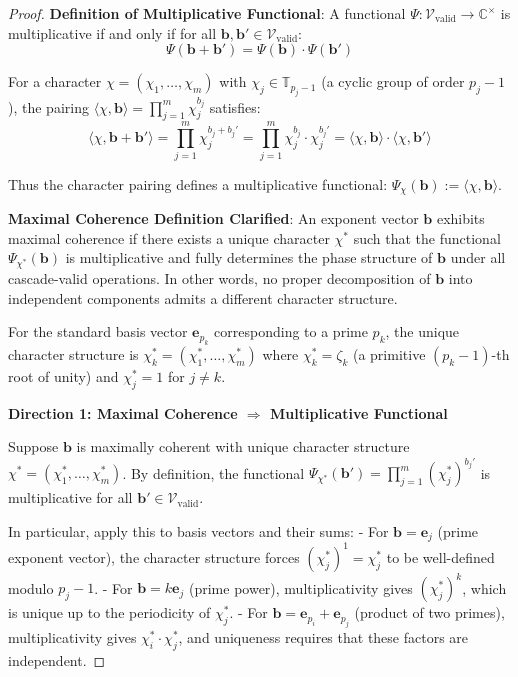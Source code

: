 \begin{proof}

\noindent \textbf{Definition of Multiplicative Functional}: A functional $\Psi: \mathcal{V}_{\text{valid}} \to \mathbb{C}^\times$ is multiplicative if and only if for all $\mathbf{b}, \mathbf{b}' \in \mathcal{V}_{\text{valid}}$:
\begin{equation}
\Psi(\mathbf{b} + \mathbf{b}') = \Psi(\mathbf{b}) \cdot \Psi(\mathbf{b}')
\end{equation}

For a character $\chi = (\chi_1, \ldots, \chi_m)$ with $\chi_j \in \mathbb{T}_{p_j-1}$ (a cyclic group of order $p_j - 1$), the pairing $\langle \chi, \mathbf{b} \rangle = \prod_{j=1}^m \chi_j^{b_j}$ satisfies:
\begin{equation}
\langle \chi, \mathbf{b} + \mathbf{b}' \rangle = \prod_{j=1}^m \chi_j^{b_j + b_j'} = \prod_{j=1}^m \chi_j^{b_j} \cdot \chi_j^{b_j'} = \langle \chi, \mathbf{b} \rangle \cdot \langle \chi, \mathbf{b}' \rangle
\end{equation}

Thus the character pairing defines a multiplicative functional: $\Psi_\chi(\mathbf{b}) := \langle \chi, \mathbf{b} \rangle$.

\noindent \textbf{Maximal Coherence Definition Clarified}: An exponent vector $\mathbf{b}$ exhibits maximal coherence if there exists a unique character $\chi^*$ such that the functional $\Psi_{\chi^*}(\mathbf{b})$ is multiplicative and fully determines the phase structure of $\mathbf{b}$ under all cascade-valid operations. In other words, no proper decomposition of $\mathbf{b}$ into independent components admits a different character structure.

For the standard basis vector $\mathbf{e}_{p_k}$ corresponding to a prime $p_k$, the unique character structure is $\chi^*_k = (\chi_1^*, \ldots, \chi_m^*)$ where $\chi_k^* = \zeta_k$ (a primitive $(p_k-1)$-th root of unity) and $\chi_j^* = 1$ for $j \neq k$.

\noindent \textbf{Direction 1: Maximal Coherence $\Rightarrow$ Multiplicative Functional}

Suppose $\mathbf{b}$ is maximally coherent with unique character structure $\chi^* = (\chi_1^*, \ldots, \chi_m^*)$. By definition, the functional $\Psi_{\chi^*}(\mathbf{b}') = \prod_{j=1}^m (\chi_j^*)^{b_j'}$ is multiplicative for all $\mathbf{b}' \in \mathcal{V}_{\text{valid}}$.

In particular, apply this to basis vectors and their sums:
- For $\mathbf{b} = \mathbf{e}_j$ (prime exponent vector), the character structure forces $(\chi_j^*)^1 = \chi_j^*$ to be well-defined modulo $p_j - 1$.
- For $\mathbf{b} = k \mathbf{e}_j$ (prime power), multiplicativity gives $(\chi_j^*)^k$, which is unique up to the periodicity of $\chi_j^*$.
- For $\mathbf{b} = \mathbf{e}_{p_i} + \mathbf{e}_{p_j}$ (product of two primes), multiplicativity gives $\chi_i^* \cdot \chi_j^*$, and uniqueness requires that these factors are independent.


\end{proof}
